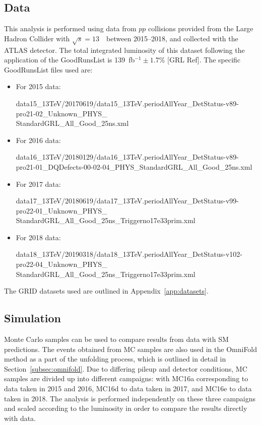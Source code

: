 \subsection{Data}

This analysis is performed using data from $pp$ collisions provided from the Large Hadron Collider with $\sqrt{s} = 13$~\TeV~between 2015--2018, and collected with the ATLAS detector. The total integrated luminosity of this dataset following the application of the GoodRunsList is 139~fb$^{-1}\pm1.7\%$ [GRL Ref]. The specific GoodRunsList files used are:

\begin{itemize}
    \item For 2015 data:

    data15\_13TeV/20170619/data15\_13TeV.periodAllYear\_DetStatus-v89-pro21-02\_Unknown\_PHYS\_\\
    StandardGRL\_All\_Good\_25ns.xml
    \item For 2016 data:

    data16\_13TeV/20180129/data16\_13TeV.periodAllYear\_DetStatus-v89-pro21-01\_DQDefects-00-02-04\_PHYS\_StandardGRL\_All\_Good\_25ns.xml
    \item For 2017 data:

    data17\_13TeV/20180619/data17\_13TeV.periodAllYear\_DetStatus-v99-pro22-01\_Unknown\_PHYS\_ \\
    StandardGRL\_All\_Good\_25ns\_Triggerno17e33prim.xml
    \item For 2018 data:

    data18\_13TeV/20190318/data18\_13TeV.periodAllYear\_DetStatus-v102-pro22-04\_Unknown\_PHYS\_ \\
    StandardGRL\_All\_Good\_25ns\_Triggerno17e33prim.xml
\end{itemize}

The GRID datasets used are outlined in Appendix~\ref{app:datasets}.

\subsection{Simulation}
Monte Carlo samples can be used to compare results from data with SM predictions. The events obtained from MC samples are also used in the OmniFold method as a part of the unfolding process, which is outlined in detail in Section~\ref{subsec:omnifold}.
Due to differing pileup and detector conditions, MC samples are divided up into different campaigns: with MC16a corresponding to data taken in 2015 and 2016, MC16d to data taken in 2017, and MC16e to data taken in 2018. The analysis is performed independently
on these three campaigns and scaled according to the luminosity in order to compare the results directly with data.

